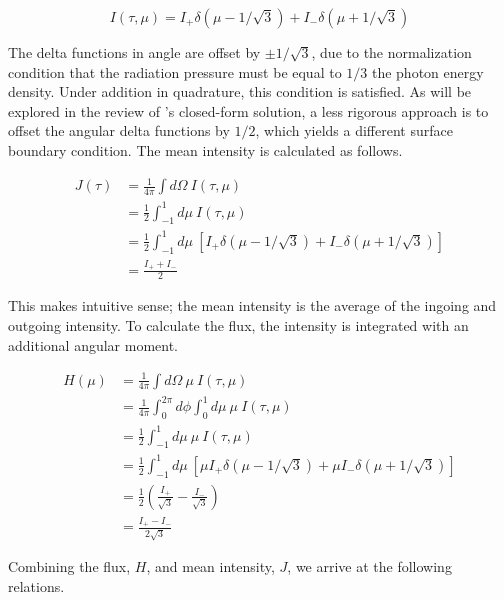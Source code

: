 \documentclass[onecolumn]{aastex63}
\begin{document}
\begin{equation}
    I(\tau, \mu) = I_+ \delta(\mu - 1/\sqrt{3}) + I_- \delta(\mu + 1/\sqrt{3})
\end{equation}

The delta functions in angle are offset by $\pm 1/\sqrt{3}$, due to the normalization condition that the radiation pressure must be equal to $1/3$ the photon energy density. Under addition in quadrature, this condition is satisfied. As will be explored in the review of \cite{2006ApJ...649...14D}'s closed-form solution, a less rigorous approach is to offset the angular delta functions by $1/2$, which yields a different surface boundary condition.  The mean intensity is calculated as follows.

\begin{equation}
    \begin{split}
    J(\tau) &= \frac{1}{4\pi}\int d\Omega\ I(\tau, \mu)\\ 
    &= \frac{1}{2}\int_{-1}^1 d\mu\ I(\tau, \mu)\\
    &= \frac{1}{2}\int_{-1}^1 d\mu\ \left[I_+ \delta(\mu - 1/\sqrt{3}) + I_- \delta(\mu + 1/\sqrt{3})\right]\\
    &= \frac{I_+ + I_-}{2}
    \end{split}
\end{equation}

This makes intuitive sense; the mean intensity is the average of the ingoing and outgoing intensity. To calculate the flux, the intensity is integrated with an additional angular moment.


\begin{equation}
    \begin{split}
        H(\mu) &= \frac{1}{4\pi}\int d\Omega\ \mu\ I(\tau, \mu)\\
        &= \frac{1}{4\pi}\int_0^{2\pi} d\phi \int_0^1 d\mu\ \mu\ I(\tau, \mu)\\
        &= \frac{1}{2} \int_{-1}^1 d\mu\ \mu\ I(\tau, \mu)\\
        &= \frac{1}{2} \int_{-1}^1 d\mu\ \left[\mu I_+ \delta(\mu - 1/\sqrt{3}) + \mu I_- \delta(\mu + 1/\sqrt{3})\right]\\
        &= \frac{1}{2} \left( \frac{I_+}{\sqrt{3}} - \frac{I_-}{\sqrt{3}}\right) \\
        &= \frac{I_+ - I_-}{2\sqrt{3}}
    \end{split}
\end{equation}

Combining the flux, $H$, and mean intensity, $J$, we arrive at the following relations.
\end{document}
